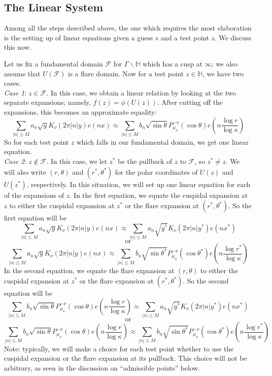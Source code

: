 \documentclass[]{article}
\begin{document}
\subsection*{The Linear System}

Among all the steps described above, the one which requires the most elaboration is the setting up of linear equations given a guess $s$ and a test point $z$.
We discuss this now.

Let us fix a fundamental domain $\mathcal{F}$ for $\Gamma\backslash\mathbb{H}$ which has a cusp at $\infty$; we also assume that $U(\mathcal{F})$ is a flare domain.
Now for a test point $z \in \mathbb{H}$, we have two cases.
\\

\textit{Case 1}: $z \in \mathcal{F}$.
In this case, we obtain a linear relation by looking at the two separate expansions; namely, $f(z) = \phi(U(z))$.
After cutting off the expansions, this becomes an approximate equality:
$$
\sum_{|n| \leq M}a_n\sqrt{y}K_\nu(2\pi|n|y)e(nx) \approx
\sum_{|n| \leq M}b_n\sqrt{\sin\theta}P^{-\nu}_{\mu_n}(\cos\theta)e\left( n\frac{\log r}{\log \kappa} \right)
$$
So for each test point $z$ which falls in our fundamental domain, we get one linear equation.
\\

\textit{Case 2}: $z \notin \mathcal{F}$.
In this case, we let $z^*$ be the pullback of $z$ to $\mathcal{F}$, so $z^* \neq z$.
We will also write $(r, \theta)$ and $(r^*, \theta^*)$ for the polar coordinates of $U(z)$ and $U(z^*)$, respectively.
In this situation, we will set up one linear equation for each of the expansions of $z$.
In the first equation, we equate the cuspidal expansion at $z$ to either the cuspidal expansion at $z^*$ or the flare expansion at $(r^*, \theta^*)$.
So the first equation will be
$$
\sum_{|n| \leq M}a_n\sqrt{y}K_\nu(2\pi|n|y)e(nx) \approx
\sum_{|n| \leq M}a_n\sqrt{y^*}K_\nu(2\pi|n|y^*)e(nx^*) $$$$
\text{or} $$$$
\sum_{|n| \leq M}a_n\sqrt{y}K_\nu(2\pi|n|y)e(nx) \approx
\sum_{|n| \leq M}b_n\sqrt{\sin\theta^*}P^{-\nu}_{\mu_n}(\cos\theta^*)e\left( n\frac{\log r^*}{\log \kappa} \right)
$$
In the second equation, we equate the flare expansion at $(r, \theta)$ to either the cuspidal expansion at $z^*$ or the flare expansion at $(r^*, \theta^*)$.
So the second equation will be
$$
\sum_{|n| \leq M}b_n\sqrt{\sin\theta}P^{-\nu}_{\mu_n}(\cos\theta)e\left( n\frac{\log r}{\log \kappa} \right) \approx
\sum_{|n| \leq M}a_n\sqrt{y^*}K_\nu(2\pi|n|y^*)e(nx^*) $$$$
\text{or} $$$$
\sum_{|n| \leq M}b_n\sqrt{\sin\theta}P^{-\nu}_{\mu_n}(\cos\theta)e\left( n\frac{\log r}{\log \kappa} \right) \approx
\sum_{|n| \leq M}b_n\sqrt{\sin\theta^*}P^{-\nu}_{\mu_n}(\cos\theta^*)e\left( n\frac{\log r^*}{\log \kappa} \right)
$$
Note: typically, we will make a choice for each test point whether to use the cuspidal expansion or the flare expansion at its pullback.
This choice will not be arbitrary, as seen in the discussion on ``admissible points'' below.
\end{document}
